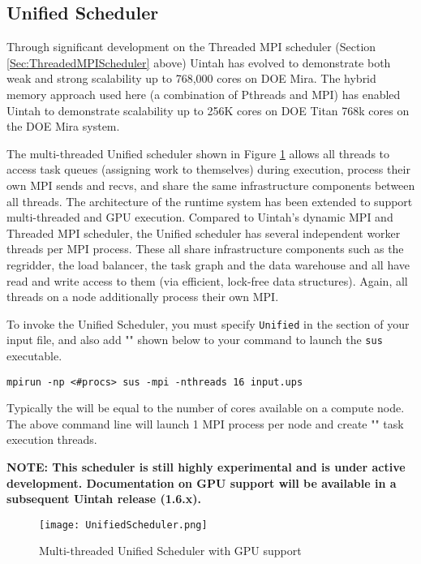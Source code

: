 \subsection{Unified Scheduler} \label{Sec:UnifiedScheduler}
Through significant development on the Threaded MPI scheduler (Section
\ref{Sec:ThreadedMPIScheduler} above) Uintah has evolved to demonstrate both
weak and strong scalability up to 768,000 cores on DOE Mira. The hybrid memory
approach used here (a combination of Pthreads and MPI) has enabled Uintah to
demonstrate scalability up to 256K cores on DOE Titan 768k cores on the DOE
Mira system.

The multi-threaded Unified scheduler shown in Figure \ref{fig:UnifiedScheduler}
allows all threads to access task queues (assigning work to themselves) during
execution, process their own MPI sends and recvs, and share the same
infrastructure components between all threads. The architecture of the runtime
system has been extended to support multi-threaded and GPU execution. Compared
to Uintah’s dynamic MPI and Threaded MPI scheduler, the Unified scheduler has
several independent worker threads per MPI process. These all share
infrastructure components such as the regridder, the load balancer, the task
graph and the data warehouse and all have read and write access to them (via
efficient, lock-free data structures). Again, all threads on a node
additionally process their own MPI.

To invoke the Unified Scheduler, you must specify \texttt{Unified} in the
 section of your input file, and also add
"" shown below to your command to launch the \texttt{sus}
executable.

\begin{Verbatim}[fontsize=\footnotesize]
mpirun -np <#procs> sus -mpi -nthreads 16 input.ups
\end{Verbatim}

Typically the  will be equal to the number of cores available on a
compute node. The above command line will launch 1 MPI process per node and
create "" task execution threads.

\vspace{20pt}

\textbf{NOTE: This scheduler is still highly experimental and is under active
development. Documentation on GPU support will be available in a subsequent
Uintah release (1.6.x).}

\begin{figure}[H]
  \centering
  \texttt{[image: UnifiedScheduler.png]}
  \caption{Multi-threaded Unified Scheduler with GPU support}
  \label{fig:UnifiedScheduler}
\end{figure}

